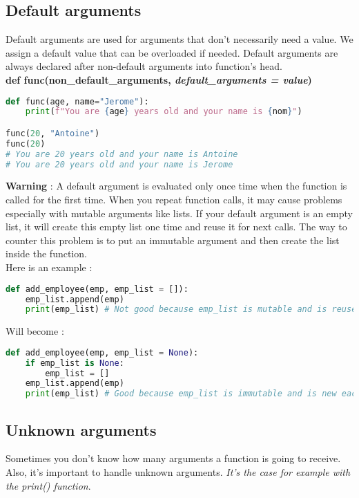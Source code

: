 \documentclass[a4paper, 12pt, titlepage]{scrartcl} %
\begin{document}
\subsection{Default arguments}
Default arguments are used for arguments that don't necessarily need a value. We assign a default value that can be overloaded if needed. Default arguments are always declared after non-default arguments into function's head. \\
\textbf{def func(non\_default\_arguments, \textit{default\_arguments = value})}

\vspace{5mm}

\begin{lstlisting}[language=Python]
def func(age, name="Jerome"):
	print(f"You are {age} years old and your name is {nom}")

func(20, "Antoine")
func(20)
# You are 20 years old and your name is Antoine
# You are 20 years old and your name is Jerome
\end{lstlisting} \vspace{5mm}

\textbf{Warning} : A default argument is evaluated only once time when the function is called for the first time. When you repeat function calls, it may cause problems especially with mutable arguments like lists. If your default argument is an empty list, it will create this empty list one time and reuse it for next calls. The way to counter this problem is to put an immutable argument and then create the list inside the function. \\
Here is an example : 
\begin{lstlisting}[language=Python]
def add_employee(emp, emp_list = []):
    emp_list.append(emp)
    print(emp_list) # Not good because emp_list is mutable and is reused each time this function is called.
\end{lstlisting} \vspace{5mm}
Will become :
\begin{lstlisting}[language=Python]
def add_employee(emp, emp_list = None):
    if emp_list is None:
        emp_list = []
    emp_list.append(emp)
    print(emp_list) # Good because emp_list is immutable and is new each time this function is called.
\end{lstlisting} \vspace{5mm}

\subsection{Unknown arguments}
Sometimes you don't know how many arguments a function is going to receive. Also, it's important to handle unknown arguments. \textit{It's the case for example with the print() function}. 
\end{document}
